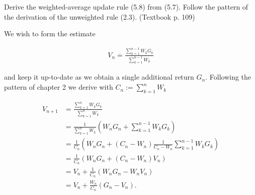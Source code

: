 
\begin{exercise}[Exercise 5.10]

Derive the weighted-average update rule (5.8) from (5.7). Follow the pattern
of the derivation of the unweighted rule (2.3). (Textbook p. 109)

\end{exercise}


\begin{solution}

We wish to form the estimate

\begin{align}
    V_n \stackrel{.}{=} \frac{\sum_{k=1}^{n-1}W_k G_k}{\sum_{k=1}^{n-1}W_k} \tag{5.7}
\end{align}

and keep it up-to-date as we obtain a single additional return $G_n$.
Following the pattern of chapter 2 we derive with
$C_n := \sum_{k=1}^{n}W_k$

\begin{align*}
    V_{n+1} &= \frac{\sum_{k=1}^{n}W_k G_k}{\sum_{k=1}^{n}W_k} \\
    &= \frac{1}{\sum_{k=1}^{n}W_k}\left(W_nG_n + \sum_{k=1}^{n - 1}W_k G_k\right) \\
    &= \frac{1}{C_n}\left(W_nG_n + (C_n - W_n) \frac{1}{C_n-W_n}\sum_{k=1}^{n - 1}W_k G_k\right) \\
    &= \frac{1}{C_n}\left(W_nG_n + (C_n - W_n) V_n\right) \\
    &= V_n + \frac{1}{C_n}\left(W_nG_n - W_nV_n\right) \\
    &= V_n + \frac{W_n}{C_n}\left(G_n - V_n\right). \tag{5.8}
\end{align*}
\end{solution}

    